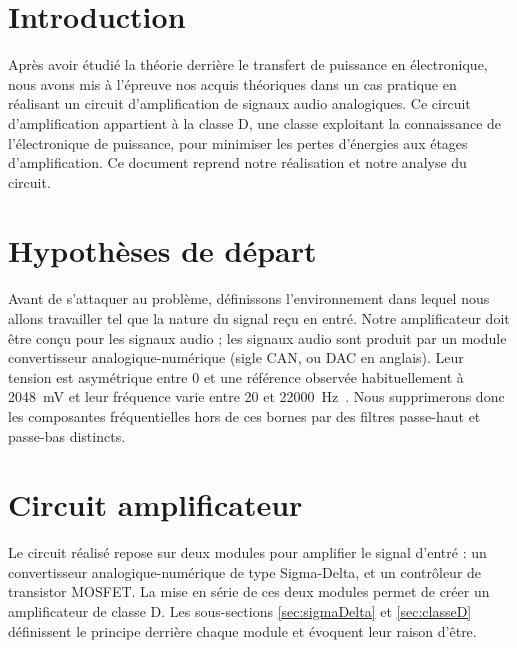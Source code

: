 \documentclass[10pt, oneside, a4paper]{article}
\begin{document}
\section*{Introduction}
Après avoir étudié la théorie derrière le transfert de puissance en électronique,
nous avons mis à l'épreuve nos acquis théoriques dans un cas pratique en réalisant un circuit d'amplification de signaux audio analogiques.
Ce circuit d'amplification appartient à la classe D, une classe exploitant la connaissance de l'électronique de puissance, pour minimiser les pertes d'énergies aux étages d'amplification.
Ce document reprend notre réalisation et notre analyse du circuit.


\section{Hypothèses de départ}
	\label{sec:hypothese}
Avant de s'attaquer au problème, définissons l'environnement dans lequel nous allons travailler tel que la nature du signal reçu en entré.
Notre amplificateur doit être conçu pour les signaux audio ;
les signaux audio sont produit par un module convertisseur analogique-numérique (sigle CAN, ou DAC en anglais).
Leur tension est asymétrique entre \num{0} et une référence observée habituellement à \SI{2048}{\milli\volt} et leur fréquence varie entre \num{20} et \SI{22000}{\hertz}~\cite{heffner2007hearing}.
Nous supprimerons donc les composantes fréquentielles hors de ces bornes par des filtres passe-haut et passe-bas distincts.


\section{Circuit amplificateur}
Le circuit réalisé repose sur deux modules pour amplifier le signal d'entré :
un convertisseur analogique-numérique de type Sigma-Delta, et un contrôleur de transistor MOSFET.
La mise en série de ces deux modules permet de créer un amplificateur de classe D.
Les sous-sections \ref{sec:sigmaDelta} et \ref{sec:classeD} définissent le principe derrière chaque module et évoquent leur raison d'être.
\end{document}
